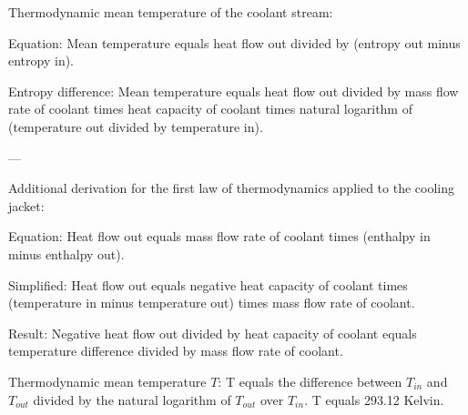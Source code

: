 Thermodynamic mean temperature of the coolant stream:  

Equation:  
Mean temperature equals heat flow out divided by (entropy out minus entropy in).  

Entropy difference:  
Mean temperature equals heat flow out divided by mass flow rate of coolant times heat capacity of coolant times natural logarithm of (temperature out divided by temperature in).  

---

Additional derivation for the first law of thermodynamics applied to the cooling jacket:  

Equation:  
Heat flow out equals mass flow rate of coolant times (enthalpy in minus enthalpy out).  

Simplified:  
Heat flow out equals negative heat capacity of coolant times (temperature in minus temperature out) times mass flow rate of coolant.  

Result:  
Negative heat flow out divided by heat capacity of coolant equals temperature difference divided by mass flow rate of coolant.

Thermodynamic mean temperature \( T \):  
T equals the difference between \( T_{in} \) and \( T_{out} \) divided by the natural logarithm of \( T_{out} \) over \( T_{in} \).  
T equals 293.12 Kelvin.